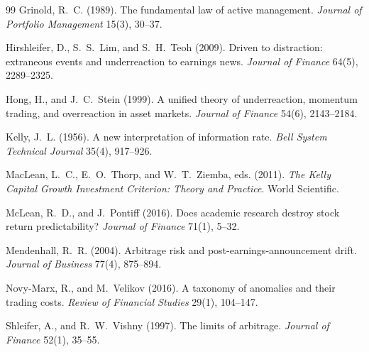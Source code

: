 \documentclass[11pt]{article}
\theoremstyle{definition}
\newcommand{\1}{\mathbf{1}}
\begin{document}
\begin{thebibliography}{99}
Grinold, R.~C. (1989). The fundamental law of active management. \textit{Journal of
Portfolio Management} 15(3), 30--37.

Hirshleifer, D., S.~S.~Lim, and S.~H.~Teoh (2009). Driven to distraction: extraneous events
and underreaction to earnings news. \textit{Journal of Finance} 64(5), 2289--2325.

Hong, H., and J.~C.~Stein (1999). A unified theory of underreaction, momentum trading, and
overreaction in asset markets. \textit{Journal of Finance} 54(6), 2143--2184.

Kelly, J.~L. (1956). A new interpretation of information rate. \textit{Bell System
Technical Journal} 35(4), 917--926.

MacLean, L.~C., E.~O.~Thorp, and W.~T.~Ziemba, eds. (2011). \textit{The Kelly Capital Growth
Investment Criterion: Theory and Practice}. World Scientific.

McLean, R.~D., and J.~Pontiff (2016). Does academic research destroy stock return
predictability? \textit{Journal of Finance} 71(1), 5--32.

Mendenhall, R.~R. (2004). Arbitrage risk and post-earnings-announcement drift.
\textit{Journal of Business} 77(4), 875--894.

Novy-Marx, R., and M.~Velikov (2016). A taxonomy of anomalies and their trading costs.
\textit{Review of Financial Studies} 29(1), 104--147.

Shleifer, A., and R.~W.~Vishny (1997). The limits of arbitrage. \textit{Journal of
Finance} 52(1), 35--55.
\end{thebibliography}
\end{document}
